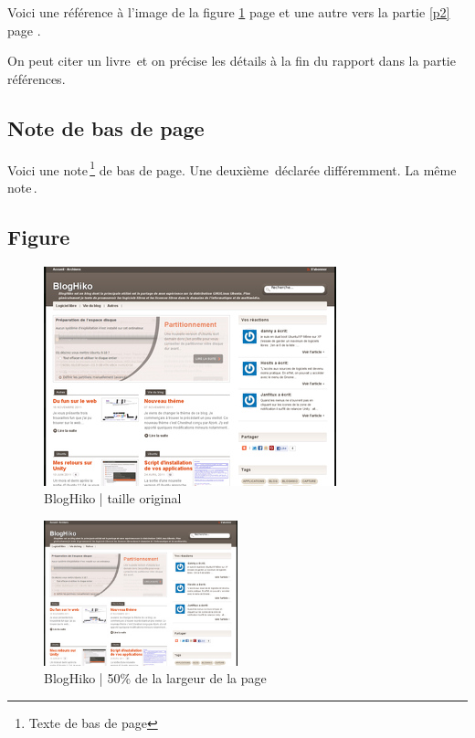 Voici une référence à l'image de la figure \ref{bloghiko} page \pageref{bloghiko} et une autre vers la partie \ref{p2} page \pageref{p2}.

On peut citer un livre\, et on précise les détails à la fin du rapport dans la partie références.


\subsection{Note de bas de page}

Voici une note\,\footnote{Texte de bas de page} de bas de page.
Une deuxième\,\footnotemark{} déclarée différemment.
La même note\,\footnotemark[\value{footnote}].



\subsection{Figure}

\begin{figure}[!ht]
    \center
    \includegraphics[]{./images/bloghiko.jpg}
    \caption{BlogHiko | taille original}
    \label{bloghiko}
\end{figure}

\begin{figure}[H]
    \center
    \includegraphics[width=0.5\textwidth]{./images/bloghiko.jpg}
    \caption{BlogHiko | 50\% de la largeur de la page}
\end{figure}


